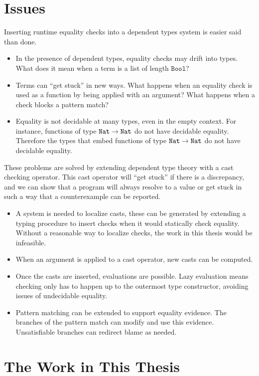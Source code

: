 \section{Issues}

Inserting runtime equality checks into a dependent types system is easier said than done.
\begin{itemize}
\item In the presence of dependent types, equality checks may drift into types.
What does it mean when a term is a list of length $\mathtt{Bool}$?
\item Terms can ``get stuck'' in new ways. 
What happens when an equality check is used as a function by being applied with an argument?
What happens when a check blocks a pattern match?
\item Equality is not decidable at many types, even in the empty context.
For instance, functions of type $\mathtt{Nat}{} \rightarrow \mathtt{Nat}{}$ do not have decidable equality.
Therefore the types that embed functions of type $\mathtt{Nat}{} \rightarrow \mathtt{Nat}{}$ do not have decidable equality.
\end{itemize}
These problems are solved by extending dependent type theory with a cast checking operator.
This cast operator will ``get stuck'' if there is a discrepancy, and we can show that a program will always resolve to a value or get stuck in such a way that a counterexample can be reported.
\begin{itemize}
\item A system is needed to localize casts, these can be generated by extending a \textbf{\bidir{}} typing procedure to insert checks when it would statically check equality.
Without a reasonable way to localize checks, the work in this thesis would be infeasible.
\item When an argument is applied to a cast operator, new casts can be computed. %
\item Once the casts are inserted, evaluations are possible.
Lazy evaluation means checking only has to happen up to the outermost type constructor, avoiding issues of undecidable equality.
\item Pattern matching can be extended to support equality evidence.
The branches of the pattern match can modify and use this evidence.
Unsatisfiable branches can redirect blame as needed.
\end{itemize}

\section{The Work in This Thesis}

